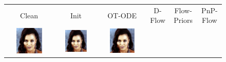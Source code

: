 \documentclass{article} %
\theoremstyle{definition}
\begin{document}
\begin{figure}[htp]
    \centering
    \begin{adjustbox}{max width=1.0\textwidth}
    \begin{tabular}{cccccc}
    \Huge Clean & \Huge Init & \Huge OT-ODE  & \Huge D-Flow & \Huge Flow-Priors & \Huge PnP-Flow \\
\includegraphics[width=0.6\textwidth]{figures/celeba/good_init/gaussian_deblurring_FFT_clean_batch11_im0.pdf} & 
\includegraphics[width=0.6\textwidth]{figures/celeba/good_init/gaussian_deblurring_FFT_noisy_batch11_im0_pnsr27.39.pdf} &
\includegraphics[width=0.6\textwidth]{figures/celeba/good_init/gaussian_deblurring_FFT_ot_ode_batch11_im0_pnsr31.73.pdf} & 

\end{tabular}
\end{adjustbox}
\end{figure}
\end{document}
